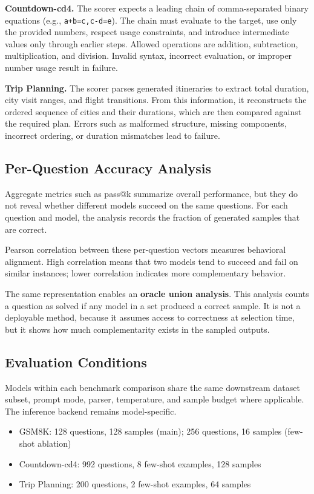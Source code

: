 \textbf{Countdown-cd4.} The scorer expects a leading chain of comma-separated binary equations (e.g., \texttt{a+b=c,c-d=e}). The chain must evaluate to the target, use only the provided numbers, respect usage constraints, and introduce intermediate values only through earlier steps. Allowed operations are addition, subtraction, multiplication, and division. Invalid syntax, incorrect evaluation, or improper number usage result in failure.

\textbf{Trip Planning.} The scorer parses generated itineraries to extract total duration, city visit ranges, and flight transitions. From this information, it reconstructs the ordered sequence of cities and their durations, which are then compared against the required plan. Errors such as malformed structure, missing components, incorrect ordering, or duration mismatches lead to failure.

\subsection{Per-Question Accuracy Analysis}

Aggregate metrics such as pass@k summarize overall performance, but they do not reveal whether different models succeed on the same questions. For each question and model, the analysis records the fraction of generated samples that are correct.

Pearson correlation between these per-question vectors measures behavioral alignment. High correlation means that two models tend to succeed and fail on similar instances; lower correlation indicates more complementary behavior.

The same representation enables an \textbf{oracle union analysis}. This analysis counts a question as solved if any model in a set produced a correct sample. It is not a deployable method, because it assumes access to correctness at selection time, but it shows how much complementarity exists in the sampled outputs.

\subsection{Evaluation Conditions}

Models within each benchmark comparison share the same downstream dataset
subset, prompt mode, parser, temperature, and sample budget where applicable.
The inference backend remains model-specific.

\begin{itemize}
    \item GSM8K: 128 questions, 128 samples (main); 256 questions, 16 samples (few-shot ablation)
    \item Countdown-cd4: 992 questions, 8 few-shot examples, 128 samples
    \item Trip Planning: 200 questions, 2 few-shot examples, 64 samples
\end{itemize}

